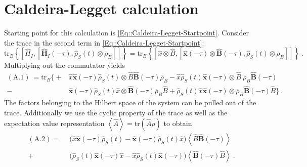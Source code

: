 	\section{Caldeira-Legget calculation} \label{Section::Appendix-Caldeira-Legget}
	Starting point for this calculation is \autoref{Eq::Caldeira-Legget-Startpoint}. Consider the trace in the second term in \autoref{Eq::Caldeira-Legget-Startpoint}:
	\begin{equation}
		\text{tr}_B \left\{  \left[{\hat{H}}_I, \left[{\boldsymbol{\hat{H}}}_I(- \tau), {\hat{\rho}}_S(t) \otimes \overline{\rho}_B \right]\right]  \right\} =	\text{tr}_B \left\{  \left[\hat{x} \otimes \hat{B}, \left[{\boldsymbol{\hat{x}}}(- \tau) \otimes \boldsymbol{\hat{B}}(- \tau), {\hat{\rho}}_S(t) \otimes \overline{\rho}_B \right]\right]  \right\}~.
	\end{equation}
	Multiplying out the commutator yields
	\begin{equation} \label{Eq::Caldeira-Leggett-Trace}
		\begin{split}
			(\text{A.1})~=\text{tr}_B \bigg \{+&\hat{x} \boldsymbol{\hat{x}}(-\tau) \hat{\rho}_S(t) \otimes \hat{B} \boldsymbol{\hat{B}}(-\tau) \overline{\rho}_B
			- \hat{x}  \hat{\rho}_S(t) \boldsymbol{\hat{x}}(-\tau) \otimes \hat{B}  ~\overline{\rho}_B \boldsymbol{\hat{B}}(-\tau)\\
			-&  \boldsymbol{\hat{x}}(-\tau) \hat{\rho}_S(t) \hat{x} \otimes  	\boldsymbol{\hat{B}}(-\tau) \overline{\rho}_B \hat{B}
			+ \hat{\rho}_S(t) \hat{x} \boldsymbol{\hat{x}}(-\tau)  \otimes \overline{\rho}_B \boldsymbol{\hat{B}}(-\tau) \hat{B}   \bigg \}~.
		\end{split}
	\end{equation}
	The factors belonging to the Hilbert space of the system can be pulled out of the trace. Additionally we use the cyclic property of the trace as well as the expectation value representation $\left \langle \hat{A} \right \rangle =	\text{tr}\left(\hat{A}\rho\right)$ to obtain
	\begin{equation}
		\begin{split}
			(\text{A}.2) =	~~  &\Big (\hat{x} \boldsymbol{\hat{x}}(-\tau) \hat{\rho}_S(t) - \boldsymbol{\hat{x}}(-\tau) \hat{\rho}_S(t) \hat{x}   \Big) \left \langle \hat{B} \boldsymbol{\hat{B}}(-\tau) \right \rangle \\
			+& \Big (  \hat{\rho}_S(t) \boldsymbol{\hat{x}}(-\tau) \hat{x}  - \hat{x} \hat{\rho}_S(t) \boldsymbol{\hat{x}}(-\tau)    \Big) \left \langle \boldsymbol{\hat{B}}(-\tau) \hat{B}  \right \rangle ~.
		\end{split}
	\end{equation}
